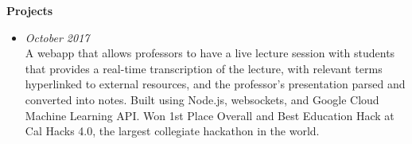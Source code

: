 \documentclass[letterpaper,8pt]{article}
\begin{document}
{%

\textbf{\large{Projects}}
\begin{itemize}[noitemsep]

\item{\small{\textbf{\href{https://devpost.com/software/megafind}{}}}}\hfill{\textit{October 2017}} \\
    \small{A webapp that allows professors to have a live lecture session with students that provides a real-time transcription of the lecture, with relevant terms hyperlinked to external resources, and the professor's presentation parsed and converted into notes. Built using Node.js, websockets, and Google Cloud Machine Learning API. Won 1st Place Overall and Best Education Hack at Cal Hacks 4.0, the largest collegiate hackathon in the world.}






\end{itemize}}
\end{document}
